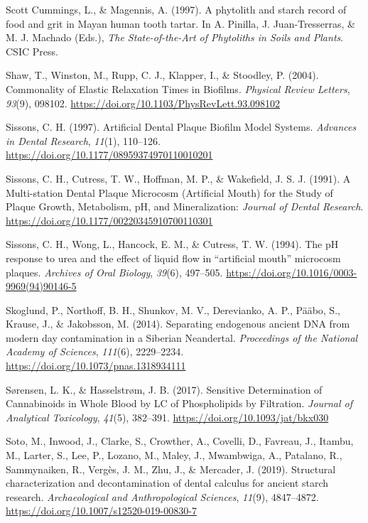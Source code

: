 \documentclass[
  b5paper,
]{book}
\newlength{\cslhangindent}
\newenvironment{CSLReferences}[2] %
 {\begin{list}{}{%
  \setlength{\itemindent}{0pt}
  \setlength{\leftmargin}{0pt}
  \setlength{\parsep}{0pt}
  \ifodd #1
   \setlength{\leftmargin}{\cslhangindent}
   \setlength{\itemindent}{-1\cslhangindent}
  \fi
  \setlength{\itemsep}{#2\baselineskip}}}
 {\end{list}}
\begin{document}
\begin{CSLReferences}{1}{0}
Scott Cummings, L., \& Magennis, A. (1997). A phytolith and starch
record of food and grit in {Mayan} human tooth tartar. In A. Pinilla, J.
Juan-Tresserras, \& M. J. Machado (Eds.), \emph{The {State-of-the-Art}
of {Phytoliths} in {Soils} and {Plants}}. {CSIC Press}.

Shaw, T., Winston, M., Rupp, C. J., Klapper, I., \& Stoodley, P. (2004).
Commonality of {Elastic Relaxation Times} in {Biofilms}. \emph{Physical
Review Letters}, \emph{93}(9), 098102.
\url{https://doi.org/10.1103/PhysRevLett.93.098102}

Sissons, C. H. (1997). Artificial {Dental Plaque Biofilm Model Systems}.
\emph{Advances in Dental Research}, \emph{11}(1), 110--126.
\url{https://doi.org/10.1177/08959374970110010201}

Sissons, C. H., Cutress, T. W., Hoffman, M. P., \& Wakefield, J. S. J.
(1991). A {Multi-station Dental Plaque Microcosm} ({Artificial Mouth})
for the {Study} of {Plaque Growth}, {Metabolism}, {pH}, and
{Mineralization}: \emph{Journal of Dental Research}.
\url{https://doi.org/10.1177/00220345910700110301}

Sissons, C. H., Wong, L., Hancock, E. M., \& Cutress, T. W. (1994). The
{pH} response to urea and the effect of liquid flow in {``artificial
mouth''} microcosm plaques. \emph{Archives of Oral Biology},
\emph{39}(6), 497--505.
\url{https://doi.org/10.1016/0003-9969(94)90146-5}

Skoglund, P., Northoff, B. H., Shunkov, M. V., Derevianko, A. P., Pääbo,
S., Krause, J., \& Jakobsson, M. (2014). Separating endogenous ancient
{DNA} from modern day contamination in a {Siberian Neandertal}.
\emph{Proceedings of the National Academy of Sciences}, \emph{111}(6),
2229--2234. \url{https://doi.org/10.1073/pnas.1318934111}

Sørensen, L. K., \& Hasselstrøm, J. B. (2017). Sensitive {Determination}
of {Cannabinoids} in {Whole Blood} by
{LC} of {Phospholipids} by
{Filtration}. \emph{Journal of Analytical Toxicology}, \emph{41}(5),
382--391. \url{https://doi.org/10.1093/jat/bkx030}

Soto, M., Inwood, J., Clarke, S., Crowther, A., Covelli, D., Favreau,
J., Itambu, M., Larter, S., Lee, P., Lozano, M., Maley, J., Mwambwiga,
A., Patalano, R., Sammynaiken, R., Vergès, J. M., Zhu, J., \& Mercader,
J. (2019). Structural characterization and decontamination of dental
calculus for ancient starch research. \emph{Archaeological and
Anthropological Sciences}, \emph{11}(9), 4847--4872.
\url{https://doi.org/10.1007/s12520-019-00830-7}


\end{CSLReferences}
\end{document}
